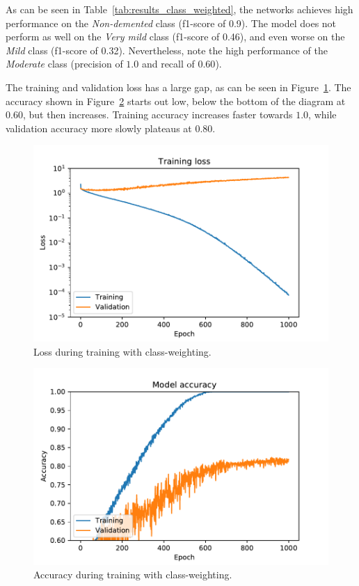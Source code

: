 \documentclass{kththesis}
\begin{document}
As can be seen in Table~\ref{tab:results_class_weighted}, the networks achieves high performance on the \textit{Non-demented} class (f1-score of 0.9). The model does not perform as well on the \textit{Very mild} class (f1-score of 0.46), and even worse on the \textit{Mild} class (f1-score of 0.32). Nevertheless, note the high performance of the \textit{Moderate} class (precision of $1.0$ and recall of $0.60$).

The training and validation loss has a large gap, as can be seen in Figure~\ref{fig:loss_class_weighting}. The accuracy shown in Figure~\ref{fig:accuracy_class_weighting} starts out low, below the bottom of the diagram at $0.60$, but then increases. Training accuracy increases faster towards $1.0$, while validation accuracy more slowly plateaus at $0.80$.
\newpage

\begin{figure}[H]
  \centering
  \includegraphics[width=0.9\linewidth]{img/loss_class_weighted.pdf}
  \caption{Loss during training with class-weighting.} \label{fig:loss_class_weighting}
\end{figure}
\begin{figure}[H]
  \centering
  \includegraphics[width=0.9\linewidth]{img/accuracy_class_weighted.pdf}
  \caption{Accuracy during training with class-weighting.} \label{fig:accuracy_class_weighting}
\end{figure}
\end{document}
